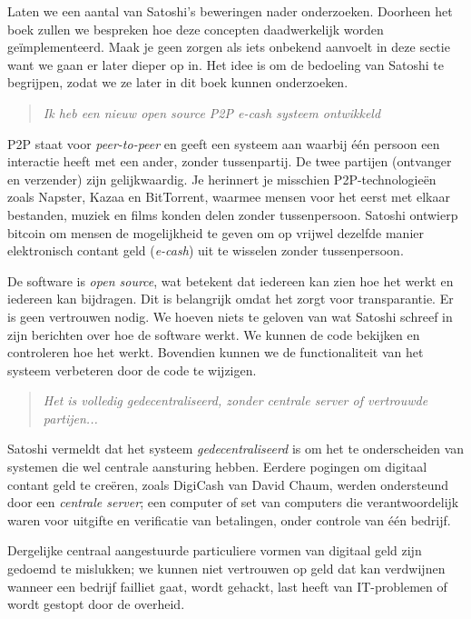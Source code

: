 \documentclass[
  letterpaper,
]{scrbook}
\begin{document}
Laten we een aantal van Satoshi's beweringen nader onderzoeken. Doorheen
het boek zullen we bespreken hoe deze concepten daadwerkelijk worden
geïmplementeerd. Maak je geen zorgen als iets onbekend aanvoelt in deze
sectie want we gaan er later dieper op in. Het idee is om de bedoeling
van Satoshi te begrijpen, zodat we ze later in dit boek kunnen
onderzoeken.

\begin{quote}
\emph{Ik heb een nieuw open source P2P e-cash systeem ontwikkeld}
\end{quote}

P2P staat voor \emph{peer-to-peer} en geeft een systeem aan waarbij één
persoon een interactie heeft met een ander, zonder tussenpartij. De twee
partijen (ontvanger en verzender) zijn gelijkwaardig. Je herinnert je
misschien P2P-technologieën zoals Napster, Kazaa en BitTorrent, waarmee
mensen voor het eerst met elkaar bestanden, muziek en films konden delen
zonder tussenpersoon. Satoshi ontwierp bitcoin om mensen de mogelijkheid
te geven om op vrijwel dezelfde manier elektronisch contant geld
(\emph{e-cash}) uit te wisselen zonder tussenpersoon.

De software is \emph{open source}, wat betekent dat iedereen kan zien
hoe het werkt en iedereen kan bijdragen. Dit is belangrijk omdat het
zorgt voor transparantie. Er is geen vertrouwen nodig. We hoeven niets
te geloven van wat Satoshi schreef in zijn berichten over hoe de
software werkt. We kunnen de code bekijken en controleren hoe het werkt.
Bovendien kunnen we de functionaliteit van het systeem verbeteren door
de code te wijzigen.

\begin{quote}
\emph{Het is volledig gedecentraliseerd, zonder centrale server of
vertrouwde partijen...}
\end{quote}

Satoshi vermeldt dat het systeem \emph{gedecentraliseerd} is om het te
onderscheiden van systemen die wel centrale aansturing hebben. Eerdere
pogingen om digitaal contant geld te creëren, zoals DigiCash van David
Chaum, werden ondersteund door een \emph{centrale server}; een computer
of set van computers die verantwoordelijk waren voor uitgifte en
verificatie van betalingen, onder controle van één bedrijf.

Dergelijke centraal aangestuurde particuliere vormen van digitaal geld
zijn gedoemd te mislukken; we kunnen niet vertrouwen op geld dat kan
verdwijnen wanneer een bedrijf failliet gaat, wordt gehackt, last heeft
van IT-problemen of wordt gestopt door de overheid.
\end{document}
